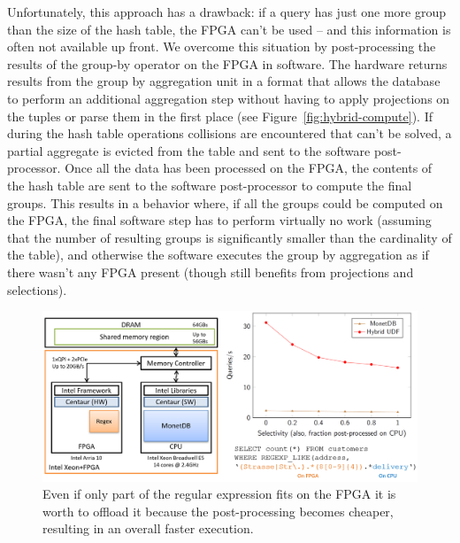 \documentclass[11pt]{article}
\begin{document}
Unfortunately, this approach has a drawback: if a query has just one more group than the size of the hash table, the FPGA can't be used -- and this information is often not available up front. We overcome this situation by post-processing the results of the group-by operator on the FPGA in software. The hardware returns results from the group by aggregation unit in a format that allows the database to perform an additional aggregation step without having to apply projections on the tuples or parse them in the first place (see Figure~\ref{fig:hybrid-compute}). If during the hash table operations collisions are encountered that can't be solved, a partial aggregate is evicted from the table and sent to the software post-processor. Once all the data has been processed on the FPGA, the contents of the hash table are sent to the software post-processor to compute the final groups. This results in a behavior where, if all the groups could be computed on the FPGA, the final software step has to perform virtually no work (assuming that the number of resulting groups is significantly smaller than the cardinality of the table), and otherwise the software executes the group by aggregation as if there wasn't any FPGA present (though still benefits from projections and selections).



\begin{figure}[t]
\centering
\includegraphics[width=0.9\linewidth]{figs/hybrid-exec.png}
\caption{Even if only part of the regular expression fits on the FPGA it is worth to offload it because the post-processing becomes cheaper, resulting in an overall faster execution.\label{fig:hybrid-regex}}
\end{figure}
\end{document}
